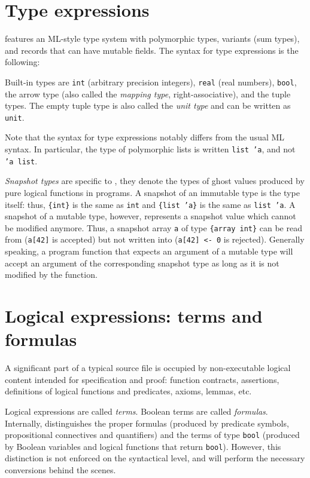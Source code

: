 \section{Type expressions}
\label{sec:types}

\whyml features an ML-style type system with polymorphic types,
variants (sum types), and records that can have mutable fields.
The syntax for type expressions is the following:
\begin{center}\end{center}
Built-in types are \texttt{int} (arbitrary precision integers),
\texttt{real} (real numbers), \texttt{bool}, the arrow type
(also called the \textit{mapping type}, right-associative),
and the tuple types.
The empty tuple type is also called the \textit{unit type}
and can be written as \texttt{unit}.

Note that the syntax for type expressions notably differs from
the usual ML syntax. In particular, the type of polymorphic lists
is written \texttt{list 'a}, and not \texttt{'a list}.

\textit{Snapshot types} are specific to \whyml, they denote
the types of ghost values produced by pure logical functions in
\whyml programs. A snapshot of an immutable type is the type
itself: thus, \texttt{\{int\}} is the same as \texttt{int} and
\texttt{\{list 'a\}} is the same as \texttt{list 'a}.
A snapshot of a mutable type, however, represents a snapshot
value which cannot be modified anymore. Thus, a snapshot array
\texttt{a} of type \texttt{\{array int\}} can be read from
(\texttt{a[42]} is accepted) but not written into
(\texttt{a[42] <- 0} is rejected). Generally speaking,
a program function that expects an argument of a mutable type
will accept an argument of the corresponding snapshot type
as long as it is not modified by the function.

\section{Logical expressions: terms and formulas}
\label{sec:terms}

A significant part of a typical \whyml source file is occupied
by non-executable logical content intended for specification
and proof: function contracts, assertions, definitions of
logical functions and predicates, axioms, lemmas, etc.

Logical expressions are called \textit{terms}. Boolean
terms are called \textit{formulas}. Internally, \why distinguishes
the proper formulas (produced by predicate symbols, propositional
connectives and quantifiers) and the terms of type \texttt{bool}
(produced by Boolean variables and logical functions that return
\texttt{bool}). However, this distinction is not enforced on the
syntactical level, and \why will perform the necessary conversions
behind the scenes.

